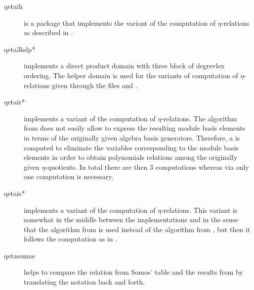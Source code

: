 \documentclass{article}
\begin{document}
\begin{description}
\item[qetaih] is a package that implements the variant of the
  computation of $\eta$-relations as described in
  \cite{Hemmecke+Radu:EtaRelations:2018}.

\item[qeta3hdp*] implements a direct product domain with three block
  of degrevlex ordering. The helper domain
   is used for the variants of
  computation of $\eta$-relations given through the files
   and .

\item[qetair*] implements a variant of the computation of
  $\eta$-relations. The algorithm  from
  \cite{Radu:RamanujanKolberg:2015} does not easily allow to express
  the resulting module basis elements in terms of the originally given
  algebra basis generators. Therefore, a \GB{} is computed to
  eliminate the variables corresponding to the module basis elements
  in order to obtain polynomials relations among the originally given
  $\eta$-quotients. In total there are then 3 \GB{} computations
  whereas via  only one \GB{} computation is
  necessary.

\item[qetais*] implements a variant of the computation of
  $\eta$-relations. This variant is somewhat in the middle between the
  implementations  and  in
  the sense that the algorithm \algoSamba{} from
  \cite{Hemmecke:DancingSambaRamanujan:2018} is used instead of the
  algorithm  from \cite{Radu:RamanujanKolberg:2015}, but then
  it follows the computation as in .

\item[qetasomos] helps to compare the relation from Somos' table and
  the results from  by translating the notation
  back and forth.
\end{description}


\end{document}
